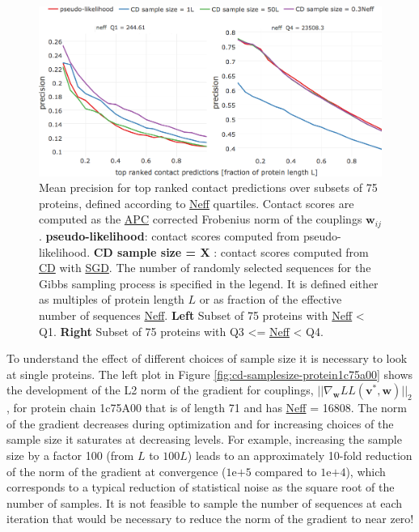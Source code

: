 \documentclass[11pt,a4paper,twoside]{book}
\renewcommand{\v}{\mathbf{v}}
\newcommand{\w}{\mathbf{w}}
\newcommand{\wij}{\mathbf{w}_{ij}}
\theoremstyle{definition}
\theoremstyle{definition}
\theoremstyle{remark}
\begin{document}
\begin{figure}

{\centering \includegraphics[width=1\linewidth]{img/full_likelihood/gibbs_sampling/precision_vs_rank_facetted_by_neff_samplesize} 

}

\caption{Mean precision for top
ranked contact predictions over subsets of 75 proteins, defined
according to \protect\hyperlink{abbrev}{Neff} quartiles. Contact scores
are computed as the \protect\hyperlink{abbrev}{APC} corrected Frobenius
norm of the couplings \(\wij\). \textbf{pseudo-likelihood}: contact
scores computed from pseudo-likelihood. \textbf{CD sample size = X }:
contact scores computed from \protect\hyperlink{abbrev}{CD} with
\protect\hyperlink{abbrev}{SGD}. The number of randomly selected
sequences for the Gibbs sampling process is specified in the legend. It
is defined either as multiples of protein length \(L\) or as fraction of
the effective number of sequences \protect\hyperlink{abbrev}{Neff}.
\textbf{Left} Subset of 75 proteins with
\protect\hyperlink{abbrev}{Neff} \textless{} Q1. \textbf{Right} Subset
of 75 proteins with Q3 \textless{}= \protect\hyperlink{abbrev}{Neff}
\textless{} Q4.}\label{fig:cd-precision-sampling-size-neff}
\end{figure}

To understand the effect of different choices of sample size it is
necessary to look at single proteins. The left plot in Figure
\ref{fig:cd-samplesize-protein1c75a00} shows the development of the L2
norm of the gradient for couplings,
\(||\nabla_{\w} L\!L(\v^*, \w)||_2\), for protein chain 1c75A00 that is
of length 71 and has \protect\hyperlink{abbrev}{Neff} = 16808. The norm
of the gradient decreases during optimization and for increasing choices
of the sample size it saturates at decreasing levels. For example,
increasing the sample size by a factor 100 (from \(L\) to \(100L\))
leads to an approximately 10-fold reduction of the norm of the gradient
at convergence (\(\mathrm{1e}{+5}\) compared to \(\mathrm{1e}{+4}\)),
which corresponds to a typical reduction of statistical noise as the
square root of the number of samples. It is not feasible to sample the
number of sequences at each iteration that would be necessary to reduce
the norm of the gradient to near zero!
\end{document}
